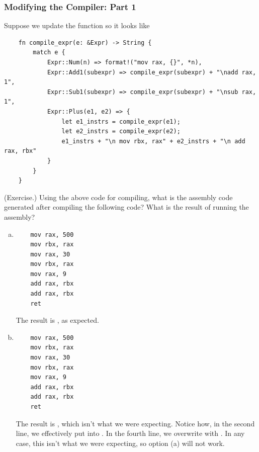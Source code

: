 \documentclass[letterpaper]{article}
\begin{document}
\subsubsection{Modifying the Compiler: Part 1}
Suppose we update the  function so it looks like  
\begin{verbatim}
    fn compile_expr(e: &Expr) -> String {
        match e {
            Expr::Num(n) => format!("mov rax, {}", *n),
            Expr::Add1(subexpr) => compile_expr(subexpr) + "\nadd rax, 1",
            Expr::Sub1(subexpr) => compile_expr(subexpr) + "\nsub rax, 1",
            Expr::Plus(e1, e2) => {
                let e1_instrs = compile_expr(e1);
                let e2_instrs = compile_expr(e2);
                e1_instrs + "\n mov rbx, rax" + e2_instrs + "\n add rax, rbx"
            }
        }
    }\end{verbatim}

\begin{mdframed}
    (Exercise.) Using the above code for compiling, what is the assembly code generated after compiling the following code? What is the result of running the assembly? 
    \begin{enumerate}[(a)]
        \item {}
        \begin{mdframed}
            \begin{verbatim}
	mov rax, 500
	mov rbx, rax
	mov rax, 30
	mov rbx, rax
	mov rax, 9
	add rax, rbx
	add rax, rbx
	ret\end{verbatim}
            The result is , as expected.
        \end{mdframed}

        \item {}
        \begin{mdframed}
            \begin{verbatim}
	mov rax, 500
	mov rbx, rax
	mov rax, 30
	mov rbx, rax
	mov rax, 9
	add rax, rbx
	add rax, rbx
	ret\end{verbatim}
            The result is , which isn't what we were expecting. Notice how, in the second line, we effectively put  into . In the fourth line, we overwrite  with . In any case, this isn't what we were expecting, so option (a) will not work. 
        \end{mdframed}
    \end{enumerate}
\end{mdframed}
\end{document}
